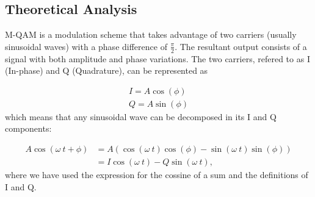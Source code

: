
\subsection{Theoretical Analysis }

M-QAM is a modulation scheme that takes advantage of two carriers (usually sinusoidal waves) with a phase difference of $\frac{\pi}{2}$. The resultant output consists of a signal with both amplitude and phase variations. The two carriers, refered to as I (In-phase) and Q (Quadrature), can be represented as

\begin{align}
	I=A\cos(\phi) \\
	Q=A\sin(\phi)
\end{align}
which means that any sinusoidal wave can be decomposed in its I and Q components:

\begin{align}
	A\cos(\omega~t+\phi)&=A\left(\cos(\omega~t)\cos(\phi)-\sin(\omega~t)\sin(\phi)\right) \\
	&=I\cos(\omega~t)-Q\sin(\omega~t),
\end{align}
where we have used the expression for the cossine of a sum and the definitions of I and Q.

